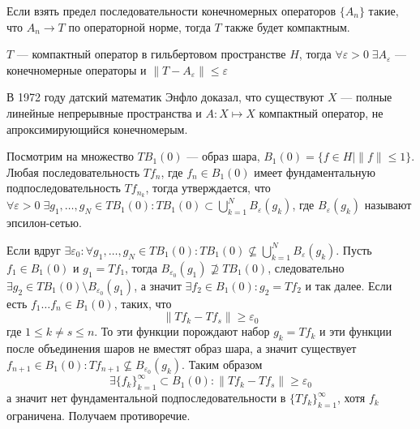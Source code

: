 \documentclass[14pt]{extarticle}
\begin{document}
Если взять предел последовательности конечномерных операторов $\{A_n\}$ такие,
что $A_n \to T$ по операторной норме, тогда $T$ также будет компактным.
\begin{Utv}
    $T$ --- компактный оператор в гильбертовом пространстве $H$, тогда 
    $\forall \varepsilon > 0\; \exists A_\varepsilon$ --- конечномерные
    операторы
    и $\|T - A_\varepsilon\| \le \varepsilon$
\end{Utv}

В 1972 году датский математик Энфло доказал, что существуют $X$ --- полные
линейные непрерывные пространства и $A : X \mapsto X$ компактный оператор, не
апроксимирующийся конечномерым.
\begin{Proof}
    Посмотрим на множество $TB_1(0)$ --- образ шара, $B_1(0) = \{f \in H \mid
    \|f\| \le 1\}$.
    Любая последовательность $Tf_n$, где $f_n \in B_1(0)$ имеет фундаментальную 
    подпоследовательность $T f_{n_k}$, тогда утверждается, что $\forall 
    \varepsilon > 0\; \exists g_1,\dots,g_N \in TB_1(0)\colon TB_1(0) \subset
    \bigcup\limits_{k = 1}^N B_\varepsilon(g_k)$, где $B_\varepsilon(g_k)$ 
    называют эпсилон-сетью.
    
    Если вдруг $\exists \varepsilon_0\colon \forall g_1,\dots,g_N \in TB_1(0)
    \colon TB_1(0) \nsubseteq \bigcup\limits_{k = 1}^N B_\varepsilon(g_k)$.
    Пусть $f_1 \in B_1(0)$ и $g_1 = T f_1$, тогда $B_{\varepsilon_0}(g_1)
    \nsupseteq TB_1(0)$, следовательно $\exists g_2 \in TB_1(0)\setminus 
    B_{\varepsilon_0}(g_1)$, а значит $\exists f_2 \in B_1(0) \colon g_2 =
    Tf_2$ и так далее.
    Если есть $f_1 \dots f_n \in B_1(0)$, таких, что
    $$
    \|T f_k - T f_s\| \ge \varepsilon_0
    $$
    где $1 \le k \ne s \le n$.
    То эти функции порождают набор $g_k = T f_k$ и эти функции после 
    объединения шаров не вместят образ шара, а значит существует $f_{n + 1}
    \in B_1(0)\colon Tf_{n + 1} \nsubseteq B_{\varepsilon_0}(g_k)$.
    Таким образом
    $$
    \exists\{f_k\}_{k = 1}^\infty \subset B_1(0) \colon \|T f_k - T f_s\| \ge
    \varepsilon_0
    $$
    а значит нет фундаментальной подпоследовательности в $\{T f_k\}_{k = 1}^
    \infty$, хотя $f_k$ ограничена.
    Получаем противоречие.
    

\end{Proof}
\end{document}
